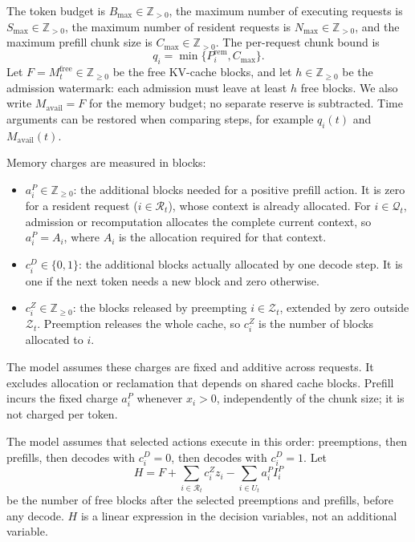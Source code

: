 \documentclass[11pt]{article}
\begin{document}
The token budget is \(B_{\max}\in\mathbb{Z}_{>0}\), the maximum number of executing requests is \(S_{\max}\in\mathbb{Z}_{>0}\), the maximum number of resident requests is \(N_{\max}\in\mathbb{Z}_{>0}\), and the maximum prefill chunk size is \(C_{\max}\in\mathbb{Z}_{>0}\). The per-request chunk bound is
\[
q_i=\min\{P_i^{\mathrm{rem}},C_{\max}\}.
\]
Let \(F=M_t^{\mathrm{free}}\in\mathbb{Z}_{\ge0}\) be the free KV-cache blocks, and let \(h\in\mathbb{Z}_{\ge0}\) be the admission watermark: each admission must leave at least \(h\) free blocks. We also write \(M_{\mathrm{avail}}=F\) for the memory budget; no separate reserve is subtracted.
Time arguments can be restored when comparing steps, for example \(q_i(t)\) and \(M_{\mathrm{avail}}(t)\).

Memory charges are measured in blocks:
\begin{itemize}
    \item \(a_i^P\in\mathbb{Z}_{\ge0}\): the additional blocks needed for a positive prefill action. It is zero for a resident request (\(i\in\mathcal{R}_t\)), whose context is already allocated. For \(i\in\mathcal{Q}_t\), admission or recomputation allocates the complete current context, so \(a_i^P=A_i\), where \(A_i\) is the allocation required for that context.
    \item \(c_i^D\in\{0,1\}\): the additional blocks actually allocated by one decode step. It is one if the next token needs a new block and zero otherwise.
    \item \(c_i^Z\in\mathbb{Z}_{\ge0}\): the blocks released by preempting \(i\in\mathcal{Z}_t\), extended by zero outside \(\mathcal{Z}_t\). Preemption releases the whole cache, so \(c_i^Z\) is the number of blocks allocated to \(i\).
\end{itemize}
The model assumes these charges are fixed and additive across requests. It excludes allocation or reclamation that depends on shared cache blocks. Prefill incurs the fixed charge \(a_i^P\) whenever \(x_i>0\), independently of the chunk size; it is not charged per token.

The model assumes that selected actions execute in this order: preemptions, then prefills, then decodes with \(c_i^D=0\), then decodes with \(c_i^D=1\). Let
\[
H=F+\sum_{i\in\mathcal{R}_t}c_i^Z z_i-\sum_{i\in U_t}a_i^P I_i^P
\]
be the number of free blocks after the selected preemptions and prefills, before any decode. \(H\) is a linear expression in the decision variables, not an additional variable.
\end{document}
